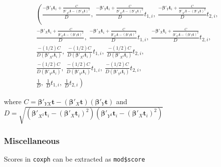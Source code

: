 \documentclass[]{article}
\begin{document}
{\tiny
{$$
\begin{aligned}
  \left(    \frac{- \pmb{\beta}'_{Y}\pmb{t}_i   + \frac{C}{\pmb{\beta}'_{X^2} \pmb{t}  - \left(  \pmb{\beta}'_{X} \pmb{t} \right)^2 }   } {D},~
  \frac{- \pmb{\beta}'_{Y}\pmb{t}_i   + \frac{C}{\pmb{\beta}'_{X^2} \pmb{t}  - \left(  \pmb{\beta}'_{X} \pmb{t} \right)^2 }   } {D} t_{1,i},~
  \frac{- \pmb{\beta}'_{Y}\pmb{t}_i   + \frac{C}{\pmb{\beta}'_{X^2} \pmb{t}  - \left(  \pmb{\beta}'_{X} \pmb{t} \right)^2 }   } {D} t_{2,i},  \right.\\
  \left.  \frac{- \pmb{\beta}'_{X}\pmb{t}_i   + \frac{C }{\pmb{\beta}'_{Y^2} \pmb{t}  - \left(  \pmb{\beta}'_{Y} \pmb{t} \right)^2 }   } {D},~
  \frac{- \pmb{\beta}'_{X}\pmb{t}_i   + \frac{C}{\pmb{\beta}'_{Y^2} \pmb{t}  - \left(  \pmb{\beta}'_{Y} \pmb{t} \right)^2 }   } {D} t_{1,i},~
  \frac{- \pmb{\beta}'_{X}\pmb{t}_i   + \frac{C}{\pmb{\beta}'_{Y^2} \pmb{t}  - \left(  \pmb{\beta}'_{Y} \pmb{t} \right)^2 }   } {D} t_{2,i},  \right.\\
  \left. \frac{-(1/2) C} {D(\pmb{\beta}'_{X^2}\pmb{t}_i)},~ \frac{-(1/2)C} {D(\pmb{\beta}'_{X^2}\pmb{t}_i)} t_{1,i},~ \frac{-(1/2)C} {D(\pmb{\beta}'_{X^2}\pmb{t}_i)} t_{2,i},\right.\\
  \left.  \frac{-(1/2)C} {D(\pmb{\beta}'_{Y^2}\pmb{t}_i)},~ \frac{-(1/2)C} {D(\pmb{\beta}'_{Y^2}\pmb{t}_i)} t_{1,i},~ \frac{-(1/2)C} {D(\pmb{\beta}'_{Y^2}\pmb{t}_i)} t_{2,i},\right.\\
  \left.  \frac{1}{D},~   \frac{1}{D}t_{1,i},~   \frac{1}{D}t_{2,i}  \right)
  \end{aligned}
$$
}}

where $C = \pmb{\beta}'_{YX} \pmb{t}  - (\pmb{\beta}'_{X} \pmb{t})(\pmb{\beta}'_{Y} \pmb{t})$ and $D = \sqrt{(\pmb{\beta}'_{X^2}\pmb{t}_i  -  (\pmb{\beta}'_{X}\pmb{t}_i)^2)(  \pmb{\beta}'_{Y^2}\pmb{t}_i - (\pmb{\beta}'_{X}\pmb{t}_i)^2   )}$

\clearpage


\subsubsection{Miscellaneous}
Scores in \texttt{coxph} can be extracted as \texttt{mod\$score}

\end{document}

